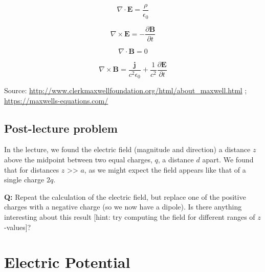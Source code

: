 \documentclass[
  letterpaper,
  DIV=11,
  numbers=noendperiod]{scrreprt}
\begin{document}
\begin{equation}

\nabla \cdot \mathbf{E} = \frac{\rho}{\epsilon_0}
\end{equation}

\begin{equation}
\nabla \times \mathbf{E} = - \frac{\partial \mathbf{B}}{\partial t} 
\end{equation}

\begin{equation}
\nabla \cdot \mathbf{B} = 0
\end{equation}

\begin{equation}
\nabla \times \mathbf{B} = \frac{\mathbf{j}}{c^2 \epsilon_0} + \frac{1}{c^2} \frac{\partial \mathbf{E}}{\partial t}
\end{equation}

Source:
\url{http://www.clerkmaxwellfoundation.org/html/about_maxwell.html} ;
\url{https://maxwells-equations.com/}

\section{Post-lecture problem}\label{post-lecture-problem}

In the lecture, we found the electric field (magnitude and direction) a
distance \(z\) above the midpoint between two equal charges, \(q\), a
distance \(d\) apart. We found that for distances \(z\)
\textgreater\textgreater{} \(a\), as we might expect the field appears
like that of a single charge \(2q\).

\textbf{Q:} Repeat the calculation of the electric field, but replace
one of the positive charges with a negative charge (so we now have a
dipole). Is there anything interesting about this result {[}hint: try
computing the field for different ranges of \(z\)-values{]}?


\chapter{Electric Potential}\label{electric-potential}

\newcommand{\l}{\mathrm{\mathbf{l}}}
\newcommand{\E}{\mathrm{\mathbf{E}}}
\newcommand{\F}{\mathrm{\mathbf{F}}}
\newcommand{\r}{\mathrm{\mathbf{r}}}

\newcommand{\x}{\mathrm{\mathbf{x}}}
\newcommand{\y}{\mathrm{\mathbf{y}}}
\newcommand{\z}{\mathrm{\mathbf{z}}}
\end{document}
